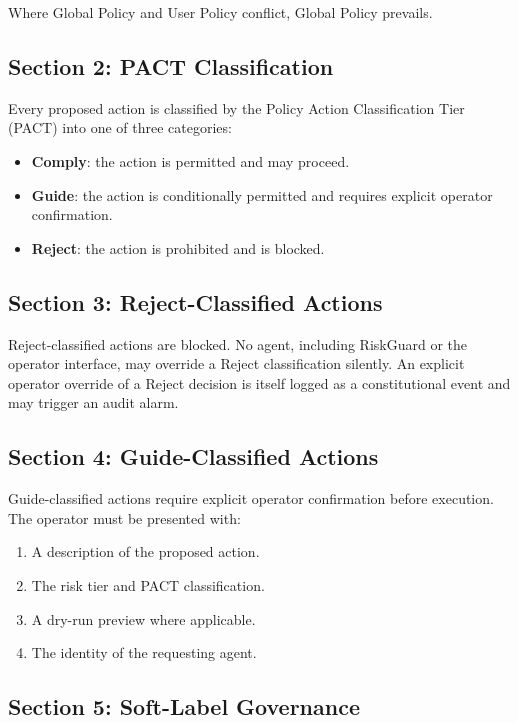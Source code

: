 \documentclass[12pt,letterpaper]{article}
\begin{document}
Where Global Policy and User Policy conflict, Global Policy prevails.

\subsection{Section 2: PACT Classification}

Every proposed action is classified by the Policy Action Classification Tier (PACT) into one of three categories:

\begin{itemize}
    \item \textbf{Comply}: the action is permitted and may proceed.
    \item \textbf{Guide}: the action is conditionally permitted and requires explicit operator confirmation.
    \item \textbf{Reject}: the action is prohibited and is blocked.
\end{itemize}

\subsection{Section 3: Reject-Classified Actions}

Reject-classified actions are blocked. No agent, including RiskGuard or the operator interface, may override a Reject classification silently. An explicit operator override of a Reject decision is itself logged as a constitutional event and may trigger an audit alarm.

\subsection{Section 4: Guide-Classified Actions}

Guide-classified actions require explicit operator confirmation before execution. The operator must be presented with:

\begin{enumerate}
    \item A description of the proposed action.
    \item The risk tier and PACT classification.
    \item A dry-run preview where applicable.
    \item The identity of the requesting agent.
\end{enumerate}

\subsection{Section 5: Soft-Label Governance}
\end{document}

